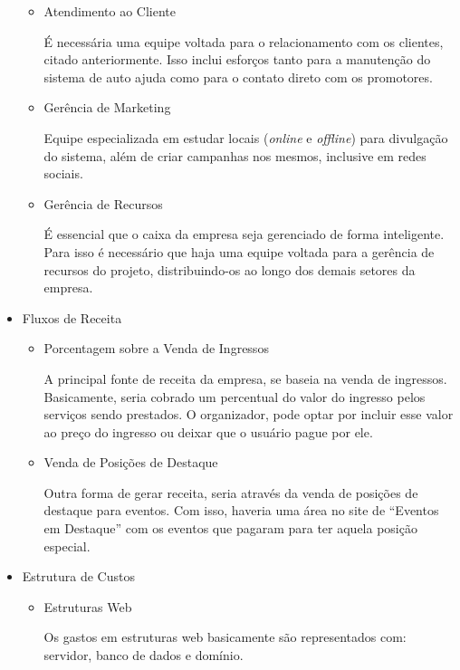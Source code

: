\begin{itemize}
\begin{itemize}
\item Atendimento ao Cliente

É necessária uma equipe voltada para o relacionamento com os clientes, citado anteriormente. Isso inclui esforços tanto para a manutenção do sistema de auto ajuda como para o contato direto com os promotores.

\item Gerência de Marketing

Equipe especializada em estudar locais (\textit{online} e \textit{offline}) para divulgação do sistema, além de criar campanhas nos mesmos, inclusive em redes sociais.

\item Gerência de Recursos

É essencial que o caixa da empresa seja gerenciado de forma inteligente. Para isso é necessário que haja uma equipe voltada para a gerência de recursos do projeto, distribuindo-os ao longo dos demais setores da empresa.

\end{itemize}

\item{Fluxos de Receita}

\begin{itemize}

\item Porcentagem sobre a Venda de Ingressos

A principal fonte de receita da empresa, se baseia na venda de ingressos. Basicamente, seria cobrado um percentual do valor do ingresso pelos serviços sendo prestados. O organizador, pode optar por incluir esse valor ao preço do ingresso ou deixar que o usuário pague por ele.

\item Venda de Posições de Destaque

Outra forma de gerar receita, seria através da venda de posições de destaque para eventos. Com isso, haveria uma área no site de ``Eventos em Destaque'' com os eventos que pagaram para ter aquela posição especial.

\end{itemize}

\item{Estrutura de Custos}

\begin{itemize}

\item Estruturas Web

Os gastos em estruturas web basicamente são representados com: servidor, banco de dados e domínio.


\end{itemize}
\end{itemize}
